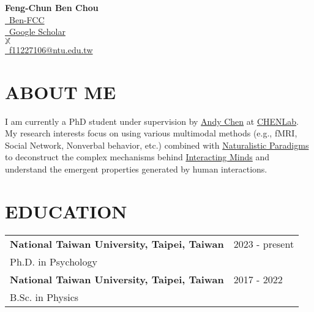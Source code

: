 \documentclass[a4paper,12pt]{article}
\newcommand{\sectionspace}{0pt} %
\begin{document}
\sloppy %

\begin{center}
    \textbf{\Huge Feng-Chun Ben Chou} \\
    \vspace{10pt}
    \href{https://github.com/Ben-FCC}{\color{black}\faGithub \ Ben-FCC} \\
    \href{https://scholar.google.com/citations?user=oZ5rsb0AAAAJ&hl=en}{\color{black}\faGoogle \ Google Scholar}\\
    \href{https://x.com/FengChunChou}{$\mathbb{X}$ \@FengChunChou}\\
    \href{mailto:f11227106@ntu.edu.tw}{\color{black}\faEnvelope \ f11227106@ntu.edu.tw} \\
    
\end{center}

\vspace{10pt}

\section*{ABOUT ME}
I am currently a PhD student under supervision by \href{https://scholar.google.com/citations?hl=en&user=wXNCX4EAAAAJ&view_op=list_works&sortby=pubdate}{Andy Chen} at \href{https://www.chenlaboratory.com/}{CHENLab}. My research interests focus on using various multimodal methods (e.g., fMRI, Social Network, Nonverbal behavior, etc.) combined with \href{https://naturalistic-data.org/content/intro.html}{Naturalistic Paradigms} to deconstruct the complex mechanisms behind \href{https://cosanlab.com/static/papers/Wheatley_2023_PISP.pdf}{Interacting Minds} and understand the emergent properties generated by human interactions.
\vspace{\sectionspace}

\section*{EDUCATION}

\begin{flushright}
\begin{tabular}{@{}p{}@{}p{}@{}}
    \textbf{National Taiwan University, Taipei, Taiwan} & \hfill 2023 - present \\
    Ph.D. in Psychology & \\[6pt]
    \textbf{National Taiwan University, Taipei, Taiwan} & \hfill 2017 - 2022 \\
    B.Sc. in Physics & \\
\end{tabular}
\end{flushright}
\end{document}
